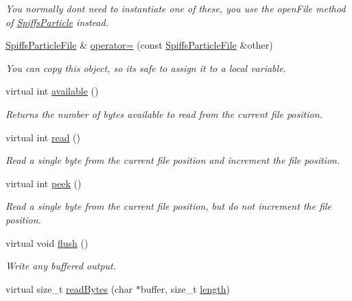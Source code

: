 \begin{DoxyCompactItemize}
\begin{DoxyCompactList}\small\item\em You normally don\textquotesingle{}t need to instantiate one of these, you use the {\ttfamily open\+File} method of \mbox{\hyperlink{class_spiffs_particle}{Spiffs\+Particle}} instead. \end{DoxyCompactList}\item 
\mbox{\hyperlink{class_spiffs_particle_file}{Spiffs\+Particle\+File}} \& \mbox{\hyperlink{class_spiffs_particle_file_aa06d87b0322a764519c5d9726da7b090}{operator=}} (const \mbox{\hyperlink{class_spiffs_particle_file}{Spiffs\+Particle\+File}} \&other)
\begin{DoxyCompactList}\small\item\em You can copy this object, so it\textquotesingle{}s safe to assign it to a local variable. \end{DoxyCompactList}\item 
virtual int \mbox{\hyperlink{class_spiffs_particle_file_a0f1c61016a86835e325bf231d90f9fbf}{available}} ()
\begin{DoxyCompactList}\small\item\em Returns the number of bytes available to read from the current file position. \end{DoxyCompactList}\item 
virtual int \mbox{\hyperlink{class_spiffs_particle_file_a00ff81c014bb8373b3031e4b6ea48c16}{read}} ()
\begin{DoxyCompactList}\small\item\em Read a single byte from the current file position and increment the file position. \end{DoxyCompactList}\item 
virtual int \mbox{\hyperlink{class_spiffs_particle_file_a2d6135f557d39fa6229aea72f8aab855}{peek}} ()
\begin{DoxyCompactList}\small\item\em Read a single byte from the current file position, but do not increment the file position. \end{DoxyCompactList}\item 
virtual void \mbox{\hyperlink{class_spiffs_particle_file_a25a803a411c55fe0ddf1c5d2576d8055}{flush}} ()
\begin{DoxyCompactList}\small\item\em Write any buffered output. \end{DoxyCompactList}\item 
virtual size\+\_\+t \mbox{\hyperlink{class_spiffs_particle_file_a389c6c38e856bb76ac7c0194d7b63ff8}{read\+Bytes}} (char $\ast$buffer, size\+\_\+t \mbox{\hyperlink{class_spiffs_particle_file_ab8b0e24661334106f1eef15bd92bf2e2}{length}})

\end{DoxyCompactItemize}
